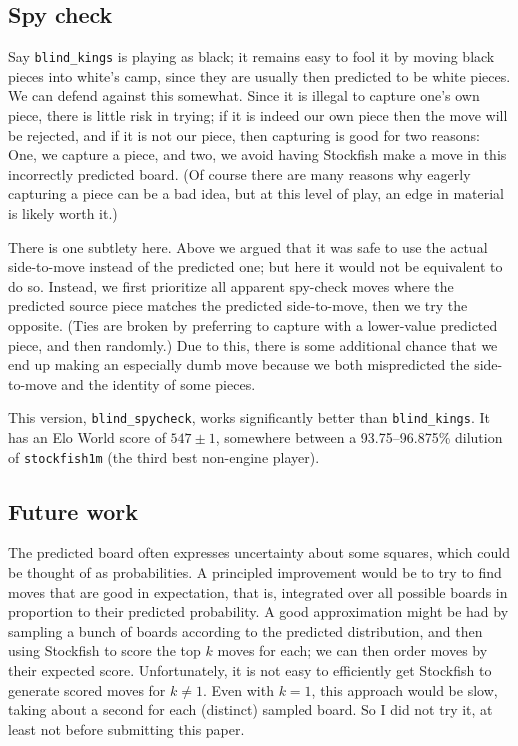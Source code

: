 \documentclass[twocolumn]{amsart}
\begin{document}
\subsection{Spy check} \label{sec:spycheck}

Say \verb+blind_kings+ is playing as black; it remains easy to fool it
by moving black pieces into white's camp, since they are usually then
predicted to be white pieces. We can defend against this somewhat.
Since it is illegal to capture one's own piece, there is little risk
in trying; if it is indeed our own piece then the move will be
rejected, and if it is not our piece, then capturing is good for two
reasons: One, we capture a piece, and two, we avoid having
Stockfish make a move in this incorrectly predicted board. (Of course
there are many reasons why eagerly capturing a piece can be a bad
idea, but at this level of play, an edge in material is likely worth
it.)

There is one subtlety here. Above we argued that it was safe to use
the actual side-to-move instead of the predicted one; but here it
would not be equivalent to do so. Instead, we first prioritize all
apparent spy-check moves where the predicted source piece matches the
predicted side-to-move, then we try the opposite. (Ties are broken by
preferring to capture with a lower-value predicted piece, and then
randomly.) Due to this, there is some additional chance that we end up
making an especially dumb move because we both mispredicted the
side-to-move and the identity of some pieces.

This version, \verb+blind_spycheck+, works significantly better than
\verb+blind_kings+. It has an Elo World score of $547 \pm 1$, somewhere
between a 93.75--96.875\% dilution of \verb+stockfish1m+ (the third
best non-engine player).

\subsection{Future work}

The predicted board often expresses uncertainty about some squares,
which could be thought of as probabilities. A principled improvement
would be to try to find moves that are good in expectation, that is,
integrated over all possible boards in proportion to their predicted
probability. A good approximation might be had by sampling a bunch of
boards according to the predicted distribution, and then using
Stockfish to score the top $k$ moves for each; we can then order moves
by their expected score. Unfortunately, it is not easy to efficiently
get Stockfish to generate scored moves for $k \neq 1$. Even with $k =
1$, this approach would be slow, taking about a second for each
(distinct) sampled board. So I did not try it, at least not before
submitting this paper.
\end{document}

